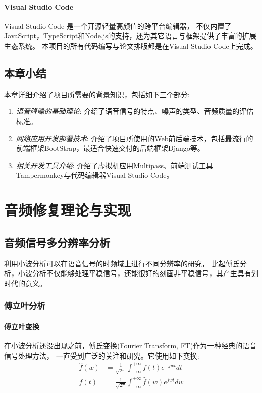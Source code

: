 \documentclass{morningstar}
\begin{document}
\paragraph{Visual Studio Code}

Visual Studio Code 是一个开源轻量高颜值的跨平台编辑器，
不仅内置了JavaScript，TypeScript和Node.js的支持，还为其它语言与框架提供了丰富的扩展生态系统。
本项目的所有代码编写与论文排版都是在Visual Studio Code上完成。


\subsection{本章小结}
本章详细介绍了项目所需要的背景知识，包括如下三个部分: 
\begin{enumerate}
\item \emph{语音降噪的基础理论}: 介绍了语音信号的特点、噪声的类型、音频质量的评估标准。
\item \emph{网络应用开发部署技术}: 介绍了项目所使用的Web前后端技术，包括最流行的前端框架BootStrap，最适合快速交付的后端框架Django等。
\item \emph{相关开发工具介绍}: 介绍了虚拟机应用Multipass、前端测试工具Tampermonkey与代码编辑器Visual Studio Code。
\end{enumerate}


\clearpage
\section{音频修复理论与实现}

\subsection{音频信号多分辨率分析}

利用小波分析可以在语音信号的时频域上进行不同分辨率的研究，
比起傅氏分析，小波分析不仅能够处理平稳信号，还能很好的刻画非平稳信号，其产生具有划时代的意义。\cite{wavelet3}

\subsubsection{傅立叶分析}

\paragraph{傅立叶变换}
在小波分析还没出现之前，傅氏变换(Fourier Transform, FT)作为一种经典的语音信号处理方法，
一直受到广泛的关注和研究。它使用如下变换: 
\begin{align}
    \hat{f}(w) & =\frac{1}{\sqrt{2\pi}}\int_{-\infty}^{+\infty} f(t) e^{-j w t} d t
    \\
    f(t) & = \frac{1}{ \sqrt{2\pi}} \int_{-\infty}^{+\infty} \hat{f}(w) e^{j w t} d w
    \label{连续时间傅立叶变换}
\end{align}
\end{document}
